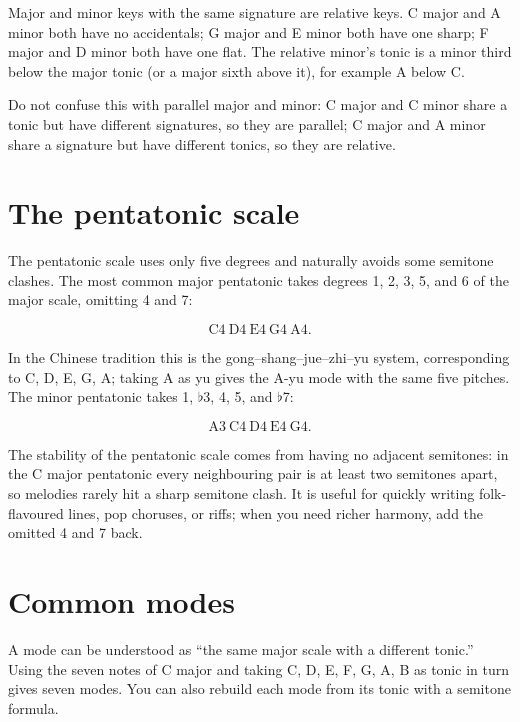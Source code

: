 Major and minor keys with the same signature are relative keys. C major and A minor both have no accidentals; G major and E minor both have one sharp; F major and D minor both have one flat. The relative minor's tonic is a minor third below the major tonic (or a major sixth above it), for example A below C.

Do not confuse this with parallel major and minor: C major and C minor share a tonic but have different signatures, so they are parallel; C major and A minor share a signature but have different tonics, so they are relative.

\section{The pentatonic scale}

The pentatonic scale uses only five degrees and naturally avoids some semitone clashes. The most common major pentatonic takes degrees 1, 2, 3, 5, and 6 of the major scale, omitting 4 and 7:

\[
\mathrm{C4\ D4\ E4\ G4\ A4}.
\]

In the Chinese tradition this is the gong--shang--jue--zhi--yu system, corresponding to C, D, E, G, A; taking A as yu gives the A-yu mode with the same five pitches. The minor pentatonic takes 1, \(\flat\)3, 4, 5, and \(\flat\)7:

\[
\mathrm{A3\ C4\ D4\ E4\ G4}.
\]

The stability of the pentatonic scale comes from having no adjacent semitones: in the C major pentatonic every neighbouring pair is at least two semitones apart, so melodies rarely hit a sharp semitone clash. It is useful for quickly writing folk-flavoured lines, pop choruses, or riffs; when you need richer harmony, add the omitted 4 and 7 back.

\section{Common modes}

A mode can be understood as ``the same major scale with a different tonic.'' Using the seven notes of C major and taking C, D, E, F, G, A, B as tonic in turn gives seven modes. You can also rebuild each mode from its tonic with a semitone formula.

